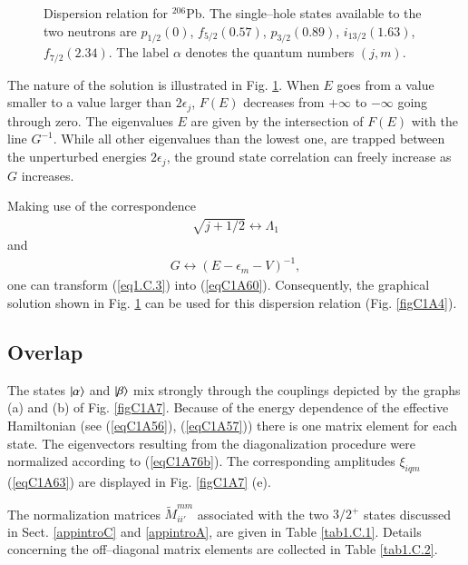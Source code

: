 \begin{subappendices}
\begin{figure}
{}
\caption{Dispersion relation for $^{206}$Pb. The single--hole states available to the two neutrons are $p_{1/2}(0)$, $f_{5/2}(0.57)$, $p_{3/2}(0.89)$, $i_{13/2}(1.63)$, $f_{7/2}(2.34)$. The label $\alpha$ denotes the quantum numbers $(j,m)$.}
\label{fig1.C.1}
\end{figure}
The nature of the solution is illustrated in Fig. \ref{fig1.C.1}. When $E$ goes from a value smaller to a value larger than $2\epsilon_j$, $F(E)$ decreases from $+\infty$ to $-\infty$ going through zero. The eigenvalues $E$ are given by the intersection of $F(E)$ with the line $G^{-1}$. While all other eigenvalues than the lowest one, are trapped between the unperturbed energies $2\epsilon_j$, the ground state correlation can freely increase as $G$ increases.


Making use of the correspondence
\begin{align}\label{eq1.C.4}
\sqrt{j+1/2}\leftrightarrow\Lambda_1
\end{align}
and
\begin{align}\label{eq1.C.5}
G\leftrightarrow(E-\epsilon_m-V)^{-1},
\end{align}
one can transform (\ref{eq1.C.3}) into (\ref{eqC1A60}). Consequently, the graphical solution shown in Fig. \ref{fig1.C.1} can be used for this dispersion relation (Fig. \ref{figC1A4}).
 \subsection{Overlap}
 The states $|{\alpha} \rangle$ and $|{\beta} \rangle$ mix strongly through the couplings depicted by the graphs (a) and (b) of Fig. \ref{figC1A7}. Because of the energy dependence of the effective Hamiltonian (see (\ref{eqC1A56}), (\ref{eqC1A57})) there is one matrix element for each state. The eigenvectors resulting from the diagonalization procedure were normalized according to (\ref{eqC1A76b}). The corresponding amplitudes $\xi_{iqm}$ (\ref{eqC1A63}) are displayed in Fig. \ref{figC1A7} (e).
 
 
 The normalization matrices $\tilde M_{ii'}^{mm}$ associated with the two $3/2^+$ states discussed in Sect. \ref{appintroC} and \ref{appintroA}, are given in Table \ref{tab1.C.1}. Details concerning the off--diagonal matrix elements are collected in Table \ref{tab1.C.2}.
 

\end{subappendices}

